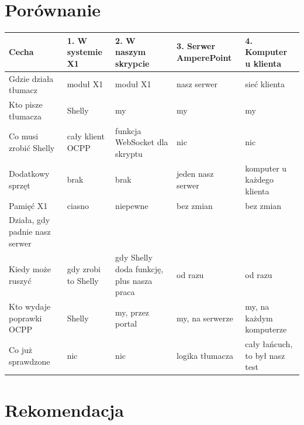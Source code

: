 \documentclass[11pt,a4paper]{article}
\begin{document}
\clearpage
\section{Porównanie}

\begin{longtable}{>{\raggedright\arraybackslash}p{3.92cm}>{\raggedright\arraybackslash}p{1.97cm}>{\raggedright\arraybackslash}p{3.01cm}>{\raggedright\arraybackslash}p{2.37cm}>{\raggedright\arraybackslash}p{3.12cm}}
\toprule
\rowcolor{apteallight}\textbf{Cecha} & \textbf{1. W systemie X1} & \textbf{2. W naszym skrypcie} & \textbf{3. Serwer AmperePoint} & \textbf{4. Komputer u klienta} \\
\midrule\endhead
\bottomrule\endfoot
Gdzie działa tłumacz & moduł X1 & moduł X1 & nasz serwer & sieć klienta \\
Kto pisze tłumacza & Shelly & my & my & my \\
Co musi zrobić Shelly & cały klient OCPP & funkcja WebSocket dla skryptu & nic & nic \\
Dodatkowy sprzęt & \leavevmode{\symbolfont\color{apgreen}\textbf{✔}} brak & \leavevmode{\symbolfont\color{apgreen}\textbf{✔}} brak & \leavevmode{\symbolfont\color{apamber}\textbf{◐}} jeden nasz serwer & \leavevmode{\symbolfont\color{apred}\textbf{✘}} komputer u każdego klienta \\
Pamięć X1 & \leavevmode{\symbolfont\color{apamber}\textbf{◐}} ciasno & \leavevmode{\symbolfont\color{apamber}\textbf{◐}} niepewne & \leavevmode{\symbolfont\color{apgreen}\textbf{✔}} bez zmian & \leavevmode{\symbolfont\color{apgreen}\textbf{✔}} bez zmian \\
Działa, gdy padnie nasz serwer & \leavevmode{\symbolfont\color{apgreen}\textbf{✔}} & \leavevmode{\symbolfont\color{apgreen}\textbf{✔}} & \leavevmode{\symbolfont\color{apred}\textbf{✘}} & \leavevmode{\symbolfont\color{apgreen}\textbf{✔}} \\
Kiedy może ruszyć & gdy zrobi to Shelly & gdy Shelly doda funkcję, plus nasza praca & od razu & od razu \\
Kto wydaje poprawki OCPP & Shelly & my, przez portal & my, na serwerze & my, na każdym komputerze \\
Co już sprawdzone & nic & nic & \leavevmode{\symbolfont\color{apamber}\textbf{◐}} logika tłumacza & \leavevmode{\symbolfont\color{apgreen}\textbf{✔}} cały łańcuch, to był nasz test \\
\end{longtable}

\section{Rekomendacja}
\end{document}
